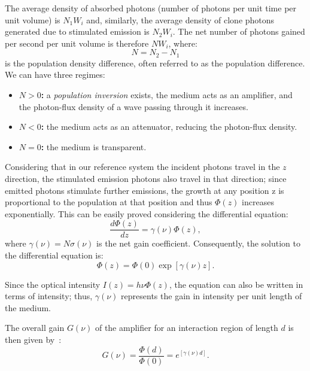 \documentclass[prl,twocolumn]{revtex4-1}
\begin{document}
The average density of absorbed photons (number of photons per unit time per unit volume) is $N_1 W_i$ and, similarly, the average density of clone photons generated due to stimulated emission is $N_2 W_i$. The net number of photons gained per second per unit volume is therefore $N W_i$, where:
%
\begin{equation}
    \label{eq:population_difference}
    N = N_2 - N_1
\end{equation}
%
is the population density difference, often referred to as the population difference. We can have three regimes:
\begin{itemize}
    \item \textbf{$N>0$:} a \textit{population inversion} exists, the medium acts as an amplifier, and the photon-flux density of a wave passing through it increases.
    \item \textbf{$N<0$:} the medium acts as an attenuator, reducing the photon-flux density.
    \item \textbf{$N=0$:} the medium is transparent.
\end{itemize}

Considering that in our reference system the incident photons travel in the $z$ direction, the stimulated emission photons also travel in that direction; since emitted photons stimulate further emissions, the growth at any position z is proportional to the population at that position and thus $\Phi(z)$ increases exponentially. This can be easily proved considering the differential equation:
%
\begin{equation}
    \frac{d\Phi(z)}{dz} = \gamma(\nu) \Phi(z),
\end{equation}
%
where $\gamma(\nu) = N \sigma(\nu)$ is the net gain coefficient. Consequently, the solution to the differential equation is:
%
\begin{equation}
    \Phi(z) = \Phi(0) \exp[\gamma(\nu) z].
\end{equation}

Since the optical intensity $I(z) = h \nu \Phi(z)$, the equation can also be written in terms of intensity; thus, $\gamma(\nu)$ represents the gain in intensity per unit length of the medium.

The overall gain $G(\nu)$ of the amplifier for an interaction region of length $d$ is then given by~\cite{Saleh2007}:
%
\begin{equation}
\label{eq:optical_gain}
    G(\nu) = \frac{\Phi(d)}{\Phi(0)} = e^[\gamma(\nu) d].
\end{equation}
\end{document}
